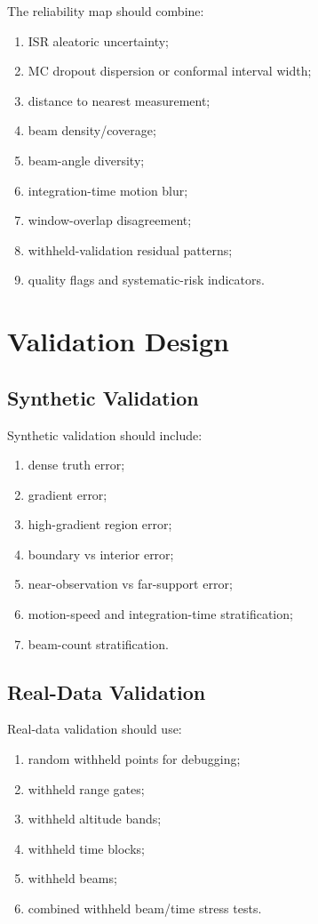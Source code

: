 \documentclass[11pt]{article}
\begin{document}
The reliability map should combine:
\begin{enumerate}[leftmargin=*]
  \item ISR aleatoric uncertainty;
  \item MC dropout dispersion or conformal interval width;
  \item distance to nearest measurement;
  \item beam density/coverage;
  \item beam-angle diversity;
  \item integration-time motion blur;
  \item window-overlap disagreement;
  \item withheld-validation residual patterns;
  \item quality flags and systematic-risk indicators.
\end{enumerate}

\section{Validation Design}

\subsection{Synthetic Validation}

Synthetic validation should include:
\begin{enumerate}[leftmargin=*]
  \item dense truth error;
  \item gradient error;
  \item high-gradient region error;
  \item boundary vs interior error;
  \item near-observation vs far-support error;
  \item motion-speed and integration-time stratification;
  \item beam-count stratification.
\end{enumerate}

\subsection{Real-Data Validation}

Real-data validation should use:
\begin{enumerate}[leftmargin=*]
  \item random withheld points for debugging;
  \item withheld range gates;
  \item withheld altitude bands;
  \item withheld time blocks;
  \item withheld beams;
  \item combined withheld beam/time stress tests.
\end{enumerate}
\end{document}
